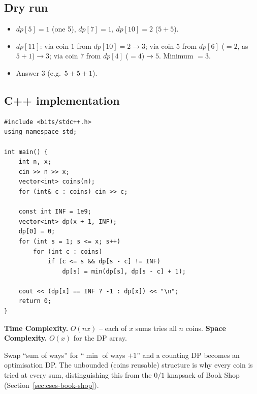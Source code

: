 \subsection*{Dry run}


\begin{itemize}
  \item $\textit{dp}[5]=1$ (one 5), $\textit{dp}[7]=1$,
        $\textit{dp}[10]=2$ ($5+5$).
  \item $\textit{dp}[11]$: via coin $1$ from $\textit{dp}[10]=2\to3$;
        via coin $5$ from $\textit{dp}[6]$ ($=2$, as $5{+}1$)$\to3$; via
        coin $7$ from $\textit{dp}[4]$ ($=4$)$\to5$. Minimum $=3$.
  \item Answer $3$ (e.g.\ $5+5+1$).
\end{itemize}

\subsection*{C++ implementation}

\begin{lstlisting}
#include <bits/stdc++.h>
using namespace std;

int main() {
    int n, x;
    cin >> n >> x;
    vector<int> coins(n);
    for (int& c : coins) cin >> c;

    const int INF = 1e9;
    vector<int> dp(x + 1, INF);
    dp[0] = 0;
    for (int s = 1; s <= x; s++)
        for (int c : coins)
            if (c <= s && dp[s - c] != INF)
                dp[s] = min(dp[s], dp[s - c] + 1);

    cout << (dp[x] == INF ? -1 : dp[x]) << "\n";
    return 0;
}
\end{lstlisting}

\begin{complexitybox}
\textbf{Time Complexity.} $O(nx)$ -- each of $x$ sums tries all $n$
coins. \textbf{Space Complexity.} $O(x)$ for the DP array.
\end{complexitybox}

\begin{takeawaybox}
Swap ``sum of ways'' for ``$\min$ of ways $+1$'' and a counting DP becomes
an optimisation DP. The unbounded (coins reusable) structure is why every
coin is tried at every sum, distinguishing this from the $0/1$ knapsack of
Book Shop (Section~\ref{sec:cses-book-shop}).
\end{takeawaybox}

